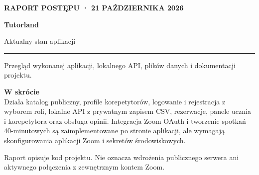 \documentclass[10pt,a4paper]{article}
\begin{document}
\begin{titlepage}
\thispagestyle{empty}
\vspace*{32mm}
{\large\color{blue}\textbf{RAPORT POSTĘPU · 21 PAŹDZIERNIKA 2026}}
\vspace{12mm}
{\Huge\bfseries\color{navy}Tutorland\par}
\vspace{4mm}
{\LARGE Aktualny stan aplikacji\par}
\vspace{13mm}
\color{blue}\rule{\textwidth}{2pt}
\vspace{9mm}
{\large Przegląd wykonanej aplikacji, lokalnego API, plików danych i dokumentacji projektu.}
\vfill
\colorbox{pale}{\parbox{\dimexpr\textwidth-2\fboxsep\relax}{\textbf{W skrócie}\\
Działa katalog publiczny, profile korepetytorów, logowanie i rejestracja z wyborem roli, lokalne API z prywatnym zapisem CSV, rezerwacje, panele ucznia i korepetytora oraz obsługa opinii. Integracja Zoom OAuth i tworzenie spotkań 40-minutowych są zaimplementowane po stronie aplikacji, ale wymagają skonfigurowania aplikacji Zoom i sekretów środowiskowych.}}\par
\vspace{12mm}
{\small\color{muted}Raport opisuje kod projektu. Nie oznacza wdrożenia publicznego serwera ani aktywnego połączenia z zewnętrznym kontem Zoom.}
\end{titlepage}
\end{document}
